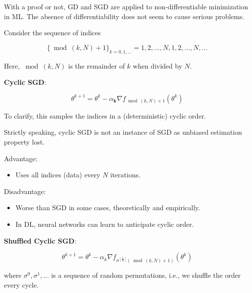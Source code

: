 \documentclass{report}
\begin{document}
With a proof or not, GD and SGD are applied to non-differentiable minimization in ML. The absence of differentiability does not seem to cause serious problems.

\begin{definition}
    Consider the sequence of indices

    $$
    \{\bmod (k, N)+1\}_{k=0,1, \ldots}=1,2, \ldots, N, 1,2, \ldots, N, \ldots
    $$

    Here, $\bmod (k, N)$ is the remainder of $k$ when divided by $N$.

    \textbf{Cyclic SGD}:

    $$
    \theta^{k+1}=\theta^{k}-\alpha_{\mathbf{k}} \nabla f_{\bmod (k, N)+1}\left(\theta^{k}\right)
    $$

    To clarify, this samples the indices in a (deterministic) cyclic order.
\end{definition}

\begin{concept}
    Strictly speaking, cyclic SGD is not an instance of SGD as unbiased estimation property lost.

    Advantage:

    \begin{itemize}
        \item Uses all indices (data) every $N$ iterations.
    \end{itemize}

    Disadvantage:

    \begin{itemize}
        \item Worse than SGD in some cases, theoretically and empirically.
        \item In DL, neural networks can learn to anticipate cyclic order.
    \end{itemize}
\end{concept}

\begin{definition}
    \textbf{Shuffled Cyclic SGD}:

    $$
    \theta^{k+1}=\theta^{k}-\alpha_{k} \nabla f_{\sigma^{\left \lfloor \frac{k}{N} \right \rfloor} (\bmod (k, N)+1)}\left(\theta^{k}\right)
    $$

    where $\sigma^{0}, \sigma^{1}, \ldots$ is a sequence of random permutations, i.e., we shuffle the order every cycle.
\end{definition}
\end{document}
